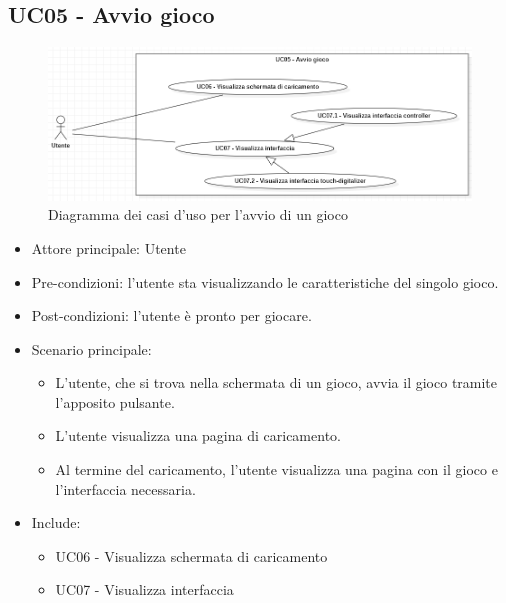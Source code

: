 \subsection{UC05 - Avvio gioco}
\begin{figure}[h]
    \centering
    \includegraphics[width=400pt]{images/usecase/UC05.png}
    \caption{Diagramma dei casi d'uso per l'avvio di un gioco}
    \label{fig:UC05}
\end{figure}
\begin{itemize}
    \item Attore principale: Utente
    \item Pre-condizioni: l'utente sta visualizzando le caratteristiche del singolo gioco.
    \item Post-condizioni: l'utente è pronto per giocare.
    \item Scenario principale: \begin{itemize}
        \item L'utente, che si trova nella schermata di un gioco, avvia il gioco tramite l'apposito pulsante.
        \item L'utente visualizza una pagina di caricamento.
        \item Al termine del caricamento, l'utente visualizza una pagina con il gioco e l'interfaccia necessaria.
    \end{itemize}
    \item Include: \begin{itemize}
        \item UC06 - Visualizza schermata di caricamento
        \item UC07 - Visualizza interfaccia
    \end{itemize}
\end{itemize}

